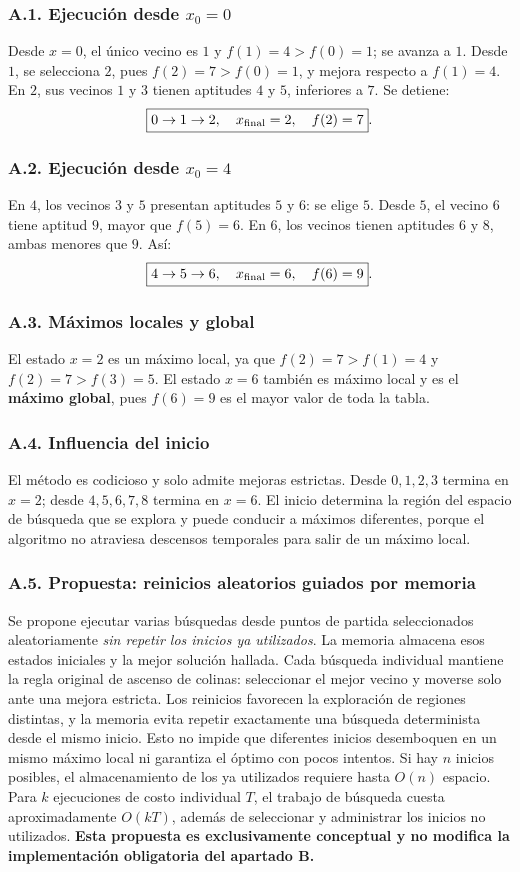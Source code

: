 \documentclass[11pt,a4paper]{article}
\begin{document}
\subsubsection{A.1. Ejecución desde $x_0=0$}
Desde $x=0$, el único vecino es $1$ y $f(1)=4>f(0)=1$; se avanza a $1$. Desde $1$, se selecciona $2$, pues $f(2)=7>f(0)=1$, y mejora respecto a $f(1)=4$. En $2$, sus vecinos $1$ y $3$ tienen aptitudes $4$ y $5$, inferiores a $7$. Se detiene:
\[\boxed{0\to1\to2,\quad x_{\rm final}=2,\quad f(2)=7}.\]
\subsubsection{A.2. Ejecución desde $x_0=4$}
En $4$, los vecinos $3$ y $5$ presentan aptitudes $5$ y $6$: se elige $5$. Desde $5$, el vecino $6$ tiene aptitud $9$, mayor que $f(5)=6$. En $6$, los vecinos tienen aptitudes $6$ y $8$, ambas menores que $9$. Así:
\[\boxed{4\to5\to6,\quad x_{\rm final}=6,\quad f(6)=9}.\]
\subsubsection{A.3. Máximos locales y global}
El estado $x=2$ es un máximo local, ya que $f(2)=7>f(1)=4$ y $f(2)=7>f(3)=5$. El estado $x=6$ también es máximo local y es el \textbf{máximo global}, pues $f(6)=9$ es el mayor valor de toda la tabla.
\subsubsection{A.4. Influencia del inicio}
El método es codicioso y solo admite mejoras estrictas. Desde $0,1,2,3$ termina en $x=2$; desde $4,5,6,7,8$ termina en $x=6$. El inicio determina la región del espacio de búsqueda que se explora y puede conducir a máximos diferentes, porque el algoritmo no atraviesa descensos temporales para salir de un máximo local.
\subsubsection{A.5. Propuesta: reinicios aleatorios guiados por memoria}
Se propone ejecutar varias búsquedas desde puntos de partida seleccionados aleatoriamente \emph{sin repetir los inicios ya utilizados}. La memoria almacena esos estados iniciales y la mejor solución hallada. Cada búsqueda individual mantiene la regla original de ascenso de colinas: seleccionar el mejor vecino y moverse solo ante una mejora estricta. Los reinicios favorecen la exploración de regiones distintas, y la memoria evita repetir exactamente una búsqueda determinista desde el mismo inicio. Esto no impide que diferentes inicios desemboquen en un mismo máximo local ni garantiza el óptimo con pocos intentos. Si hay $n$ inicios posibles, el almacenamiento de los ya utilizados requiere hasta $O(n)$ espacio. Para $k$ ejecuciones de costo individual $T$, el trabajo de búsqueda cuesta aproximadamente $O(kT)$, además de seleccionar y administrar los inicios no utilizados. \textbf{Esta propuesta es exclusivamente conceptual y no modifica la implementación obligatoria del apartado B.}
\end{document}
